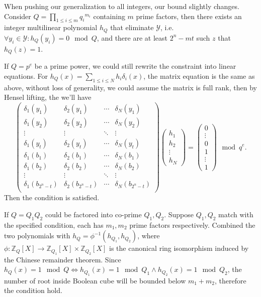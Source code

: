 \documentclass{article}
\begin{document}
When pushing our generalization to all integers, our bound slightly changes. Consider $Q=\prod_{1\leq i\leq m}{q_i}^{m_i}$ containing $m$ prime factors, then there exists an integer multilinear polynomial $h_Q$ that eliminate $\mathcal{Y}$, i.e. $\forall y_i\in\mathcal{Y}: h_Q(y_i)=0\mod Q$, and there are at least $2^n-mt$ such $z$ that $h_Q(z)=1$.

If $Q=p^e$ be a prime power, we could still rewrite the constraint into linear equations. For $h_Q(x)=\sum_{1\leq i\leq N}h_i\delta_i(x)$, the matrix equation is the same as above, without loss of generality, we could assume the matrix is full rank, then by Hensel lifting, the we'll have
$$
\begin{pmatrix}
\delta_1(y_1)&\delta_2(y_1)&\cdots&\delta_N(y_1)\\
\delta_1(y_2)&\delta_2(y_2)&\cdots&\delta_N(y_2)\\
\vdots&\vdots&\ddots&\vdots\\
\delta_1(y_t)&\delta_2(y_t)&\cdots&\delta_N(y_t)\\
\delta_1(b_1)&\delta_2(b_1)&\cdots&\delta_N(b_1)\\
\delta_1(b_2)&\delta_2(b_2)&\cdots&\delta_N(b_2)\\
\vdots&\vdots&\ddots&\vdots\\
\delta_1(b_{2^n-t})&\delta_2(b_{2^n-t})&\cdots&\delta_N(b_{2^n-t})\\
\end{pmatrix}
\begin{pmatrix}
h_1\\h_2\\\vdots\\h_N
\end{pmatrix}
=
\begin{pmatrix}
0\\\vdots\\0\\1\\\vdots\\1
\end{pmatrix}
\mod q^e.
$$
Then the condition is satisfied.

If $Q=Q_1Q_2$ could be factored into co-prime $Q_1, Q_2$. Suppose $Q_1, Q_2$ match with the specified condition, each has $m_1, m_2$ prime factors respectively. Combined the two polynomials with $h_Q=\phi^{-1}(h_{Q_1},h_{Q_2})$, where $\phi: \mathbb{Z}_Q[X]\rightarrow \mathbb{Z}_{Q_1}[X]\times\mathbb{Z}_{Q_2}[X]$ is the canonical ring isomorphism induced by the Chinese remainder theorem. Since $h_Q(x)=1\mod Q\iff h_{Q_1}(x)=1\mod Q_1\land h_{Q_2}(x)=1\mod Q_2$, the number of root inside Boolean cube will be bounded below $m_1+m_2$, therefore the condition hold.
\end{document}
